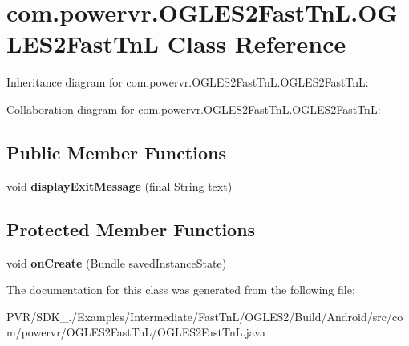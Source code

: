 \hypertarget{classcom_1_1powervr_1_1_o_g_l_e_s2_fast_tn_l_1_1_o_g_l_e_s2_fast_tn_l}{\section{com.\+powervr.\+O\+G\+L\+E\+S2\+Fast\+Tn\+L.\+O\+G\+L\+E\+S2\+Fast\+Tn\+L Class Reference}
\label{classcom_1_1powervr_1_1_o_g_l_e_s2_fast_tn_l_1_1_o_g_l_e_s2_fast_tn_l}
}


Inheritance diagram for com.\+powervr.\+O\+G\+L\+E\+S2\+Fast\+Tn\+L.\+O\+G\+L\+E\+S2\+Fast\+Tn\+L\+:


Collaboration diagram for com.\+powervr.\+O\+G\+L\+E\+S2\+Fast\+Tn\+L.\+O\+G\+L\+E\+S2\+Fast\+Tn\+L\+:
\subsection*{Public Member Functions}
\begin{DoxyCompactItemize}
\item 
\hypertarget{classcom_1_1powervr_1_1_o_g_l_e_s2_fast_tn_l_1_1_o_g_l_e_s2_fast_tn_l_a893b6c122b071324b67d13c15a652d2b}{void {\bfseries display\+Exit\+Message} (final String text)}\label{classcom_1_1powervr_1_1_o_g_l_e_s2_fast_tn_l_1_1_o_g_l_e_s2_fast_tn_l_a893b6c122b071324b67d13c15a652d2b}

\end{DoxyCompactItemize}
\subsection*{Protected Member Functions}
\begin{DoxyCompactItemize}
\item 
\hypertarget{classcom_1_1powervr_1_1_o_g_l_e_s2_fast_tn_l_1_1_o_g_l_e_s2_fast_tn_l_a3f4bb779a8be3340442976e77332932c}{void {\bfseries on\+Create} (Bundle saved\+Instance\+State)}\label{classcom_1_1powervr_1_1_o_g_l_e_s2_fast_tn_l_1_1_o_g_l_e_s2_fast_tn_l_a3f4bb779a8be3340442976e77332932c}

\end{DoxyCompactItemize}


The documentation for this class was generated from the following file\+:\begin{DoxyCompactItemize}
\item 
P\+V\+R/\+S\+D\+K\+\_./\+Examples/\+Intermediate/\+Fast\+Tn\+L/\+O\+G\+L\+E\+S2/\+Build/\+Android/src/com/powervr/\+O\+G\+L\+E\+S2\+Fast\+Tn\+L/O\+G\+L\+E\+S2\+Fast\+Tn\+L.\+java\end{DoxyCompactItemize}
